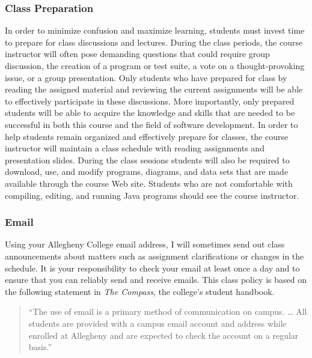 \subsubsection*{Class Preparation}

In order to minimize confusion and maximize learning, students must invest time to prepare for class discussions and
lectures.  During the class periods, the course instructor will often pose demanding questions that could require group
discussion, the creation of a program or test suite, a vote on a thought-provoking issue, or a group presentation.
Only students who have prepared for class by reading the assigned material and reviewing the current assignments will be
able to effectively participate in these discussions.  More importantly, only prepared students will be able to acquire
the knowledge and skills that are needed to be successful in both this course and the field of software development.  In
order to help students remain organized and effectively prepare for classes, the course instructor will maintain a class
schedule with reading assignments and presentation slides.   During the class sessions students will also be required to
download, use, and modify programs, diagrams, and data sets that are made available through the course Web site.
Students who are not comfortable with compiling, editing, and running Java programs should see the course instructor.

\subsubsection*{Email}

Using your Allegheny College email address, I will sometimes send out class announcements about matters such as
assignment clarifications or changes in the schedule. It is your responsibility to check your email at least once a day
and to ensure that you can reliably send and receive emails. This class policy is based on the following statement in
{\em The Compass}, the college's student handbook.

\vspace*{-.1in}
\begin{quote}
``The use of email is a primary method of communication on campus. \ldots
All students are provided with a campus email account and address while
enrolled at Allegheny and are expected to check the account on a regular
basis.''
\end{quote}
\vspace*{-.15in}

